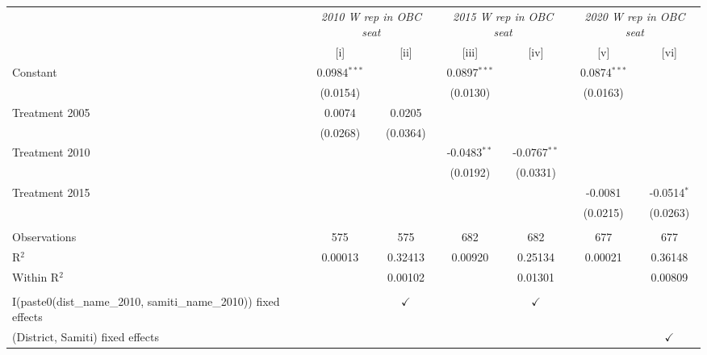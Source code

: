 
\begingroup
\centering
\begin{tabular}{lcccccc}
   \toprule
    & \multicolumn{2}{c}{\textit{2010 W rep in OBC seat}} & \multicolumn{2}{c}{\textit{2015 W rep in OBC seat}} & \multicolumn{2}{c}{\textit{2020 W rep in OBC seat}}\\
                                                                     & [i]            & [ii]          & [iii]          & [iv]           & [v]            & [vi]\\  
   \midrule 
   Constant                                                          & 0.0984$^{***}$ &               & 0.0897$^{***}$ &                & 0.0874$^{***}$ &   \\   
                                                                     & (0.0154)       &               & (0.0130)       &                & (0.0163)       &   \\   
   Treatment 2005                                                    & 0.0074         & 0.0205        &                &                &                &   \\   
                                                                     & (0.0268)       & (0.0364)      &                &                &                &   \\   
   Treatment  2010                                                   &                &               & -0.0483$^{**}$ & -0.0767$^{**}$ &                &   \\   
                                                                     &                &               & (0.0192)       & (0.0331)       &                &   \\   
   Treatment 2015                                                    &                &               &                &                & -0.0081        & -0.0514$^{*}$\\   
                                                                     &                &               &                &                & (0.0215)       & (0.0263)\\   
    \\
   Observations                                                      & 575            & 575           & 682            & 682            & 677            & 677\\  
   R$^2$                                                             & 0.00013        & 0.32413       & 0.00920        & 0.25134        & 0.00021        & 0.36148\\  
   Within R$^2$                                                      &                & 0.00102       &                & 0.01301        &                & 0.00809\\  
    \\
   I(paste0(dist\_name\_2010, samiti\_name\_2010)) fixed effects     &                & $\checkmark$  &                & $\checkmark$   &                & \\  
   (District, Samiti) fixed effects                                  &                &               &                &                &                & $\checkmark$\\   
   \bottomrule
\end{tabular}
\par\endgroup


